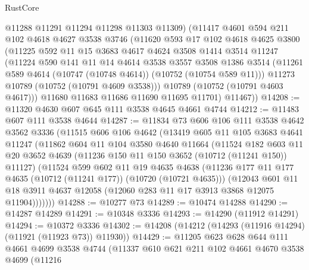 \begin{lexlean}{RustCore}
\begin{coremodule}
        @11288
        @11291
        @11294
        @11298
        @11303
        @11309)
      (@11417
        @4601
        @594
        @211
        @102
        @4618
        @4627
        @3538
        @3746
        (@11620
          @593
          @17
          @102
          @4618
          @4625
          @3800
          (@11225
            @592
            @11
            @15
            @3683
            @4617
            @4624
            @3508
            @1414
            @3514
            @11247
            (@11224
              @590
              @141
              @11
              @14
              @4614
              @3538
              @3557
              @3508
              @1386
              @3514
              (@11261 @589 @4614 (@10747 (@10748 @4614)) (@10752 (@10754 @589 @11)))
              @11273
              @10789
              (@10752 (@10791 @4609 @3538)))
            @10789
            (@10752 (@10791 @4603 @4617)))
          @11680
          @11683
          @11686
          @11690
          @11695
          @11701)
        @11467))
@14208 := @11320 @4630 @607 @645 @111 @3538 @4645 @4661 @4744
@14212 := @11483 @607 @111 @3538 @4644
@14287 := @11834
    @73
    @606
    @106
    @111
    @3538
    @4642
    @3562
    @3336
    (@11515
      @606
      @106
      @4642
      (@13419
        @605
        @11
        @105
        @3683
        @4641
        @11247
        (@11862
          @604
          @11
          @104
          @3580
          @4640
          @11664
          (@11524
            @182
            @603
            @11
            @20
            @3652
            @4639
            (@11236 @150 @11 @150 @3652 (@10712 (@11241 @150)) @11127)
            (@11524
              @599
              @602
              @11
              @19
              @4635
              @4638
              (@11236 @177 @11 @177 @4635 (@10712 (@11241 @177)) (@10720 (@10721 @4635)))
              (@12043
                @601
                @11
                @18
                @3911
                @4637
                @12058
                (@12060 @283 @11 @17 @3913 @3868 @12075 @11904)))))))
@14288 := @10277 @73
@14289 := @10474 @14288
@14290 := @14287 @14289
@14291 := @10348 @3336
@14293 := @14290 (@11912 @14291)
@14294 := @10372 @3336
@14302 := @14208 (@14212 (@14293 (@11916 @14294) (@11921 (@11923 @73)) @11930))
@14429 := @11205
    @623
    @628
    @644
    @111
    @4661
    @4699
    @3538
    @4744
    (@11337
      @610
      @621
      @211
      @102
      @4661
      @4670
      @3538
      @4699
      (@11216

\end{coremodule}
\end{lexlean}
